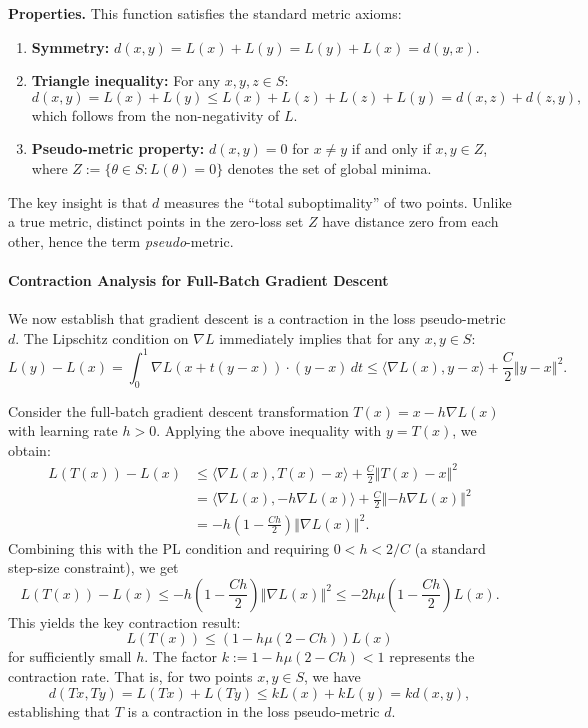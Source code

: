 \documentclass[10pt]{article} %
\theoremstyle{plain}
\theoremstyle{definition}
\theoremstyle{remark}
\begin{document}
\textbf{Properties.} This function satisfies the standard metric axioms:
\begin{enumerate}
    \item \textbf{Symmetry:} $d(x,y) = L(x)+L(y) = L(y)+L(x) = d(y,x)$.
    \item \textbf{Triangle inequality:} For any $x,y,z \in S$:
    \[
        d(x,y) = L(x)+L(y) \leq L(x)+L(z)+L(z)+L(y) = d(x,z)+d(z,y),
    \]
    which follows from the non-negativity of $L$.
    \item \textbf{Pseudo-metric property:} $d(x,y) = 0$ for $x \neq y$ if and only if $x,y \in Z$, where $Z := \{\theta \in S : L(\theta)=0\}$ denotes the set of global minima.
\end{enumerate}

The key insight is that $d$ measures the ``total suboptimality'' of two points. Unlike a true metric, distinct points in the zero-loss set $Z$ have distance zero from each other, hence the term \emph{pseudo}-metric.

\paragraph{Contraction Analysis for Full-Batch Gradient Descent}
We now establish that gradient descent is a contraction in the loss pseudo-metric $d$. The Lipschitz condition on $\nabla L$ immediately implies that for any $x, y \in S$:
\begin{equation*}
    L(y)-L(x)=\int_{0}^{1}\nabla L(x+t(y-x)) \cdot (y-x) \, dt \leq \langle\nabla L(x),y-x\rangle+\frac{C}{2}\left\Vert y-x\right\Vert ^{2}.
\end{equation*}

Consider the full-batch gradient descent transformation $T(x)=x-h\nabla L(x)$ with learning rate $h > 0$. 
Applying the above inequality with $y = T(x)$, we obtain:
\begin{align*}
    L(T(x))-L(x) &\leq\langle\nabla L(x),T(x)-x\rangle+\frac{C}{2}\left\Vert T(x)-x\right\Vert ^{2}
    \\
    & =\langle\nabla L(x),-h\nabla L(x)\rangle+\frac{C}{2}\left\Vert -h\nabla L(x)\right\Vert ^{2}
    \\
    &=-h\left(1-\frac{Ch}{2}\right)\left\Vert \nabla L(x)\right\Vert ^{2}.
\end{align*}
Combining this with the PL condition and requiring $0<h<2/C$ (a standard step-size constraint), we get
\[
    L(T(x))-L(x) \leq -h\left(1-\frac{Ch}{2}\right)\left\Vert \nabla L(x)\right\Vert ^{2} \leq -2h\mu\left(1-\frac{Ch}{2}\right)L(x).
\]
This yields the key contraction result:
\[
    L(T(x))\leq\left(1-h\mu(2-Ch)\right)L(x)
\]
for sufficiently small $h$. The factor $k := 1-h\mu(2-Ch) < 1$ represents the contraction rate.
That is, for two points $x,y \in S$, we have
\[
    d(Tx,Ty)=L(Tx)+L(Ty)\leq k L(x)+k L(y)=kd(x,y),
\]
establishing that $T$ is a contraction in the loss pseudo-metric $d$.
\end{document}
